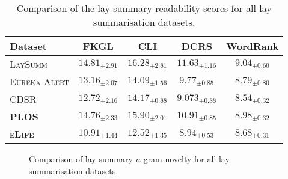 \documentclass[11pt]{article}
\begin{document}
\begin{table*}[]
    \centering
    \begin{tabular}{lcccc}
        \hline
        \textbf{Dataset} & \textbf{FKGL} & \textbf{CLI} & \textbf{DCRS} & \textbf{WordRank}  \\
        \hline
        \textsc{LaySumm}        & $14.81_{\pm 2.91}$ & $16.28_{\pm 2.81}$ & $11.63_{\pm 1.16}$ & $9.04_{\pm 0.60}$ \\
        \textsc{Eureka-Alert}   & $13.16_{\pm 2.07}$ & $14.09_{\pm 1.56}$ & $9.77 _{\pm 0.85}$ &  $8.79_{\pm 0.80}$ \\
        \textsc{CDSR}           & $12.72_{\pm 2.16}$ & $14.17_{\pm 0.88}$ & $9.073_{\pm 0.88}$ & $8.54_{\pm 0.32}$ \\
        \textbf{\textsc{PLOS}}  & $14.76_{\pm 2.33}$ & $15.90_{\pm 2.01}$ & $10.91_{\pm 0.85}$ & $8.98_{\pm 0.32}$ \\
        \textbf{\textsc{eLife}} & $10.91_{\pm 1.44}$ & $12.52_{\pm 1.35}$ & $8.94_{\pm 0.53}$ & $8.68_{\pm 0.31}$ \\
        \hline
    \end{tabular}
    \caption{Comparison of the lay summary readability scores for all lay summarisation datasets.}
    \label{tab:dataset_readability}
\end{table*}

\begin{figure*}[ht]
    \centering
    \caption{Comparison of lay summary $n$-gram novelty for all lay summarisation datasets.}
    \label{fig:ds_novelty_comp}
\end{figure*}
\end{document}

